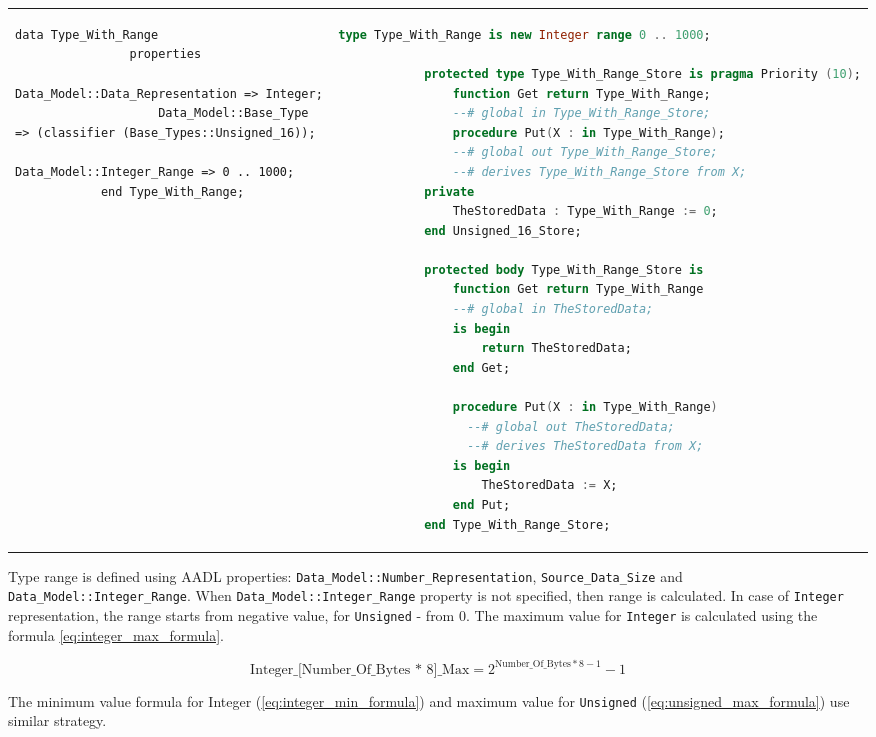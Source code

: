 \begin{center}
\begin{longtable}{| p{2in} | p{4in} |}
		\begin{lstlisting}[language=aadl]
			data Type_With_Range
				properties
					Data_Model::Data_Representation => Integer;
					Data_Model::Base_Type => (classifier (Base_Types::Unsigned_16));
					Data_Model::Integer_Range => 0 .. 1000;
			end Type_With_Range;
		\end{lstlisting} 
		&
		\begin{lstlisting}[language=ada]
			type Type_With_Range is new Integer range 0 .. 1000;
    
		    protected type Type_With_Range_Store is pragma Priority (10);
			    function Get return Type_With_Range;
		        --# global in Type_With_Range_Store;
		        procedure Put(X : in Type_With_Range);
		        --# global out Type_With_Range_Store;
		        --# derives Type_With_Range_Store from X;
		    private
		        TheStoredData : Type_With_Range := 0;
		    end Unsigned_16_Store;

		    protected body Type_With_Range_Store is
		        function Get return Type_With_Range
		        --# global in TheStoredData;
		        is begin 
		        	return TheStoredData; 
		        end Get;

		        procedure Put(X : in Type_With_Range)
		          --# global out TheStoredData;
		          --# derives TheStoredData from X;
		        is begin 
		        	TheStoredData := X; 
		        end Put;
		    end Type_With_Range_Store;
		\end{lstlisting}
	\end{longtable}
\end{center}
\doublespacing

Type range is defined using AADL properties: \lstinline{Data_Model::Number_Representation}, \lstinline{Source_Data_Size} and \lstinline{Data_Model::Integer_Range}. When \lstinline{Data_Model::Integer_Range} property is not specified, then range is calculated. In case of \lstinline{Integer} representation, the range starts from negative value, for \lstinline{Unsigned} - from 0. The maximum value for \lstinline{Integer} is calculated using the formula \ref{eq:integer_max_formula}. 

\begin{equation} \label{eq:integer_max_formula}
	\text{Integer\_[Number\_Of\_Bytes * 8]\_Max} = 2^{\text{Number\_Of\_Bytes} * 8 - 1} - 1
\end{equation}

The minimum value formula for Integer (\ref{eq:integer_min_formula}) and maximum value for \lstinline{Unsigned} (\ref{eq:unsigned_max_formula}) use similar strategy.

